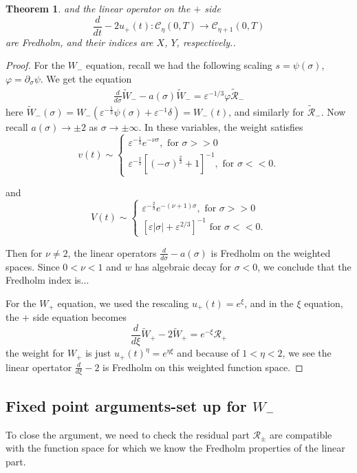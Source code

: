 \documentclass[letterpaper,11pt]{article}
\newcommand{\eps}{\varepsilon}
\numberwithin{equation}{section}
\theoremstyle{plain}
\newtheorem{theorem}{Theorem}[section]
\begin{document}
\begin{enumerate}
\begin{itemize}
\begin{theorem}
and the linear operator on the $+$ side
\[
\frac{d}{dt}  - 2u_+(t) : \mathcal{C}_\eta (0,T) \to \mathcal{C}_{\eta+1}(0,T)
\]
are Fredholm, and their indices are $X$, $Y$, respectively..
\end{theorem}

\begin{proof}
For the $W_-$ equation, recall we had the following scaling $s=\psi(\sigma)$, $\varphi = \partial_\sigma \psi$. We get the equation
\begin{align*}
\frac{d}{d\sigma} \tilde{W}_- -a(\sigma)\tilde{W}_- = \eps^{-1/3}\varphi \tilde{\mathcal{R}}_-
\end{align*}
here $\tilde{W}_-(\sigma) = W_-(\eps^{-\frac{1}{3}} \psi(\sigma)+\eps^{-1}\delta)=W_-(t)$, and similarly for $\tilde{\mathcal{R}}_-$. Now recall $a(\sigma) \to \pm 2 $ as $\sigma \to \pm \infty$. In these variables, the weight satisfies
\[
v(t) \sim \begin{cases}
 \eps^{-\frac{1}{3}} e^{-\nu \sigma},  \text{ for }\sigma >>0 \\
\eps^{-\frac{2}{3}}[(-\sigma)^{\frac{2}{3}}+1]^{-1}, \text{ for }\sigma << 0.
\end{cases}
\]

and 
\[
V(t) \sim \begin{cases}
 \eps^{-\frac{2}{3}} e^{-(\nu+1)\sigma},  \text{ for }\sigma >>0 \\
[\eps |\sigma|+\eps^{2/3}]^{-1} \text{ for }\sigma << 0.
\end{cases}
\]

Then for $\nu \neq 2$, the linear operators $\frac{d}{d\sigma} -a(\sigma)$ is Fredholm on the weighted spaces.  Since $0 < \nu < 1$ and $w$ has algebraic decay for $\sigma<0$, we conclude that the Fredholm index is...

For the $W_+$ equation, we used the rescaling $u_+(t)  = e^\xi$, and in the $\xi$ equation, the $+$ side equation becomes
\[
\frac{d}{d\xi}\tilde{W}_+ -2\tilde{W}_+ = e^{-\xi}\mathcal{R}_+
\]
the weight for $W_+$ is just $u_+(t)^{\eta}=e^{\eta \xi}$ and because of $1<\eta<2$, we see the linear opertator $\frac{d}{d\xi}-2$ is Fredholm on this weighted function space.
\end{proof}

\pagebreak

\subsection{Fixed point arguments-set up for $W_-$}
To close the argument, we need to check the residual part $\mathcal{R}_{\pm}$ are compatible with the function space for which we know the Fredholm properties of the linear part.


\end{itemize}
\end{enumerate}
\end{document}
